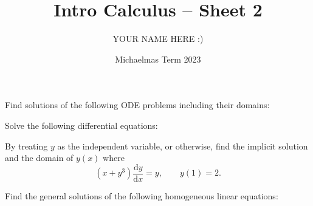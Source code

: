 \documentclass[answers]{exam}
\title{Intro Calculus -- Sheet 2}
\author{YOUR NAME HERE :)}
\date{Michaelmas Term 2023}
\newcommand*{\bump}{\vspace{1em}\phantom{}\vspace{-1.75em}}
\begin{document}
\maketitle
\begin{questions}

\question%
Find solutions of the following ODE problems including their domains:
\begin{parts}
\part%
\bump \[
	\frac{\mathrm{d} y}{\mathrm{d} x}+x y=x, \qquad y(0)=0;
\]

\part%
\bump \[
	2x^3\frac{\mathrm dy}{\mathrm dx}-3x^2y=1,\qquad y(1)=0;
\]

\part%
\bump \[
	\frac{\mathrm{d} y}{\mathrm{d} x}-y \tan x=1, \qquad y(0)=1.
\]
\end{parts}



\question%
Solve the following differential equations:
\begin{parts}
\part%
\bump \[
	(1-x^2)\frac{\mathrm dy}{\mathrm dx}+2xy=(1-x^2)^{3/2},
\]

\part%
\bump \[
	\frac{\mathrm{d} y}{\mathrm{d} x}-(\cot x) y+\csc x=0.
\]
\end{parts}



\question%
By treating $y$ as the independent variable, or otherwise, find the implicit solution and the domain of $y(x)$ where \[
	(x+y^3) \frac{\mathrm dy}{\mathrm dx}=y, \qquad y(1)=2.
\]



\question%
Find the general solutions of the following homogeneous linear equations:
\begin{parts}
\part%
\bump \[
	\frac{\mathrm{d}^{2} y}{\mathrm{d} x^{2}}-y=0;
\]


\end{parts}
\end{questions}
\end{document}

